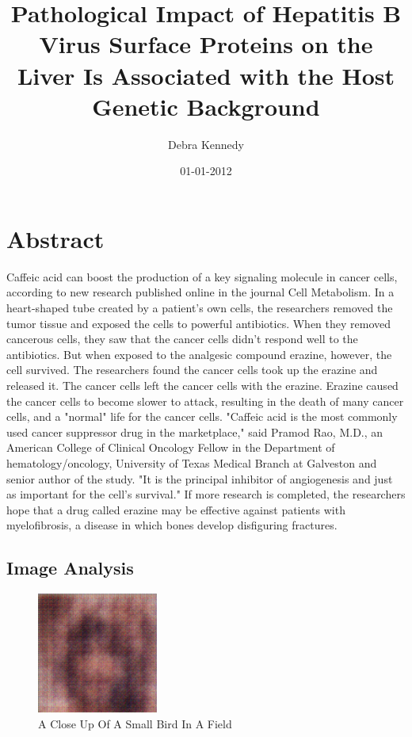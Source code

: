 \documentclass{article}%
\title{Pathological Impact of Hepatitis B Virus Surface Proteins on the Liver Is Associated with the Host Genetic Background}%
\author{Debra Kennedy}%
\affil{Department of Oral Biology and Pathology, School of Dental Medicine, Stony Brook University, Stony Brook, New York, United States of America}%
\date{01{-}01{-}2012}%
\begin{document}
%
\normalsize%
\maketitle%
\section{Abstract}%
\label{sec:Abstract}%
Caffeic acid can boost the production of a key signaling molecule in cancer cells, according to new research published online in the journal Cell Metabolism.\newline%
In a heart{-}shaped tube created by a patient's own cells, the researchers removed the tumor tissue and exposed the cells to powerful antibiotics. When they removed cancerous cells, they saw that the cancer cells didn't respond well to the antibiotics. But when exposed to the analgesic compound erazine, however, the cell survived.\newline%
The researchers found the cancer cells took up the erazine and released it. The cancer cells left the cancer cells with the erazine. Erazine caused the cancer cells to become slower to attack, resulting in the death of many cancer cells, and a "normal" life for the cancer cells.\newline%
"Caffeic acid is the most commonly used cancer suppressor drug in the marketplace," said Pramod Rao, M.D., an American College of Clinical Oncology Fellow in the Department of hematology/oncology, University of Texas Medical Branch at Galveston and senior author of the study. "It is the principal inhibitor of angiogenesis and just as important for the cell's survival."\newline%
If more research is completed, the researchers hope that a drug called erazine may be effective against patients with myelofibrosis, a disease in which bones develop disfiguring fractures.

%
\subsection{Image Analysis}%
\label{subsec:ImageAnalysis}%


\begin{figure}[h!]%
\centering%
\includegraphics[width=150px]{500_fake_images/samples_5_190.png}%
\caption{A Close Up Of A Small Bird In A Field}%
\end{figure}

%
\end{document}
